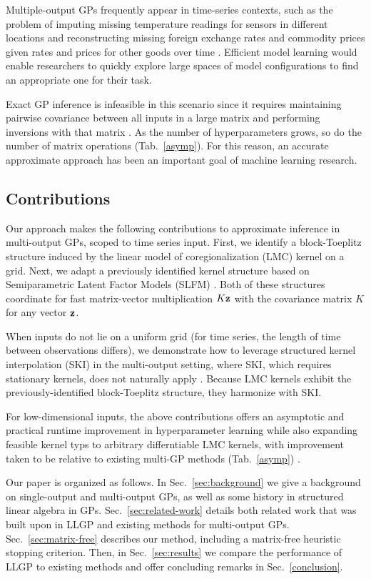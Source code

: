 \documentclass{article}
\begin{document}
Multiple-output GPs frequently appear in time-series contexts, such as the problem of imputing missing temperature readings for sensors in different locations and reconstructing missing foreign exchange rates and commodity prices given rates and prices for other goods over time \cite{osborne2008towards, alvarez2010efficient}. Efficient model learning would enable researchers to quickly explore large spaces of model configurations to find an appropriate one for their task.

Exact GP inference is infeasible in this scenario since it requires maintaining pairwise covariance between all inputs in a large matrix and performing inversions with that matrix \cite{williams1996gaussian}. As the number of hyperparameters grows, so do the number of matrix operations (Tab.~\ref{asymp}). For this reason, an accurate approximate approach has been an important goal of machine learning research.

\subsection{Contributions}

Our approach makes the following contributions to approximate inference in multi-output GPs, scoped to time series input. First, we identify a block-Toeplitz structure induced by the linear model of coregionalization (LMC) kernel on a grid. Next, we adapt a previously identified kernel structure based on Semiparametric Latent Factor Models (SLFM) \cite{seeger2005semiparametric}. Both of these structures coordinate for fast matrix-vector multiplication $K\textbf{z}$ with the covariance matrix $K$ for any vector $\textbf{z}$.

When inputs do not lie on a uniform grid (for time series, the length of time between observations differs), we demonstrate how to leverage structured kernel interpolation (SKI) in the multi-output setting, where SKI, which requires stationary kernels, does not naturally apply \cite{kiss-gp}. Because LMC kernels exhibit the previously-identified block-Toeplitz structure, they harmonize with SKI.

For low-dimensional inputs, the above contributions offers an asymptotic and practical runtime improvement in hyperparameter learning while also expanding feasible kernel typs to arbitrary differntiable LMC kernels, with improvement taken to be relative to existing multi-GP methods (Tab.~\ref{asymp}) \cite{nguyen2014collaborative}.

Our paper is organized as follows. In Sec.~\ref{sec:background} we give a background on single-output and multi-output GPs, as well as some history in structured linear algebra in GPs. Sec.~\ref{sec:related-work} details both related work that was built upon in LLGP and existing methods for multi-output GPs. Sec.~\ref{sec:matrix-free} describes our method, including a matrix-free heuristic stopping criterion. Then, in Sec.~\ref{sec:results} we compare the performance of LLGP to existing methods and offer concluding remarks in Sec.~\ref{conclusion}.
\end{document}
